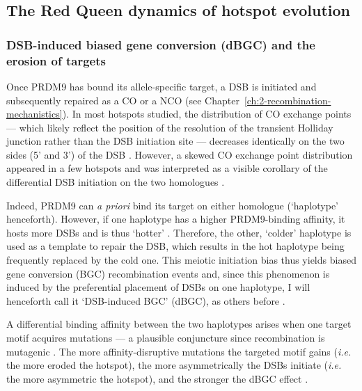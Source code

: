 \subsection{The Red Queen dynamics of hotspot evolution}

\subsubsection{DSB-induced biased gene conversion (dBGC) and the erosion of targets}

Once PRDM9 has bound its allele-specific target, a DSB is initiated and subsequently repaired as a CO or a NCO (see Chapter~\ref{ch:2-recombination-mechanistics}).
In most hotspots studied, the distribution of CO exchange points — which likely reflect the position of the resolution of the transient Holliday junction rather than the DSB initiation site \citep{smith2001homologous} — decreases identically on the two sides (5’ and 3’) of the DSB \citep{arnheim2007mammalian}.
However, a skewed CO exchange point distribution appeared in a few hotspots \citep{jeffreys2002reciprocal,jeffreys2005factors,yauk2003highresolution,neumann2006polymorphism} and was interpreted as a visible corollary of the differential DSB initiation on the two homologues \citep{baudat2007cis}.

Indeed, PRDM9 can \textit{a priori} bind its target on either homologue (‘haplotype’ henceforth). 
However, if one haplotype has a higher PRDM9-binding affinity, it hosts more DSBs and is thus ‘hotter’ \citep{zelazowski2016marks}.
Therefore, the other, ‘colder’ haplotype is used as a template to repair the DSB, which results in the hot haplotype being frequently replaced by the cold one. 
This meiotic initiation bias thus yields biased gene conversion (BGC) recombination events and, since this phenomenon is induced by the preferential placement of DSBs on one haplotype, I will henceforth call it ‘DSB-induced BGC’ (dBGC), as others before \citep{lesecque2014biased, grey2018prdm9}.

A differential binding affinity between the two haplotypes arises when one target motif acquires mutations — a plausible conjuncture since recombination is mutagenic \citep{arbeithuber2015crossovers,rattray2015elevated}.
The more affinity-disruptive mutations the targeted motif gains (\textit{i.e.} the more eroded the hotspot), the more asymmetrically the DSBs initiate (\textit{i.e.} the more asymmetric the hotspot), and the stronger the dBGC effect \citep[reviewed in][]{tiemann-boege2017consequences}.



